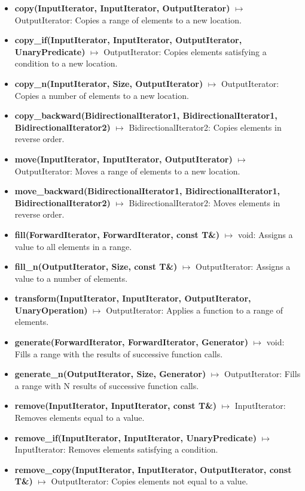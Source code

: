 \documentclass{report}
\begin{document}
    \pagebreak \bigbreak \noindent 
    \begin{itemize}
        \item \textbf{copy(InputIterator, InputIterator, OutputIterator)} \(\mapsto\) OutputIterator: Copies a range of elements to a new location.
    \item \textbf{copy\_if(InputIterator, InputIterator, OutputIterator, UnaryPredicate)} \(\mapsto\) OutputIterator: Copies elements satisfying a condition to a new location.
    \item \textbf{copy\_n(InputIterator, Size, OutputIterator)} \(\mapsto\) OutputIterator: Copies a number of elements to a new location.
    \item \textbf{copy\_backward(BidirectionalIterator1, BidirectionalIterator1, BidirectionalIterator2)} \(\mapsto\) BidirectionalIterator2: Copies elements in reverse order.
    \item \textbf{move(InputIterator, InputIterator, OutputIterator)} \(\mapsto\) OutputIterator: Moves a range of elements to a new location.
    \item \textbf{move\_backward(BidirectionalIterator1, BidirectionalIterator1, BidirectionalIterator2)} \(\mapsto\) BidirectionalIterator2: Moves elements in reverse order.
    \item \textbf{fill(ForwardIterator, ForwardIterator, const T\&)} \(\mapsto\) void: Assigns a value to all elements in a range.
    \item \textbf{fill\_n(OutputIterator, Size, const T\&)} \(\mapsto\) OutputIterator: Assigns a value to a number of elements.
    \item \textbf{transform(InputIterator, InputIterator, OutputIterator, UnaryOperation)} \(\mapsto\) OutputIterator: Applies a function to a range of elements.
    \item \textbf{generate(ForwardIterator, ForwardIterator, Generator)} \(\mapsto\) void: Fills a range with the results of successive function calls.
    \item \textbf{generate\_n(OutputIterator, Size, Generator)} \(\mapsto\) OutputIterator: Fills a range with N results of successive function calls.
    \item \textbf{remove(InputIterator, InputIterator, const T\&)} \(\mapsto\) InputIterator: Removes elements equal to a value.
    \item \textbf{remove\_if(InputIterator, InputIterator, UnaryPredicate)} \(\mapsto\) InputIterator: Removes elements satisfying a condition.
    \item \textbf{remove\_copy(InputIterator, InputIterator, OutputIterator, const T\&)} \(\mapsto\) OutputIterator: Copies elements not equal to a value.

\end{itemize}
\end{document}
